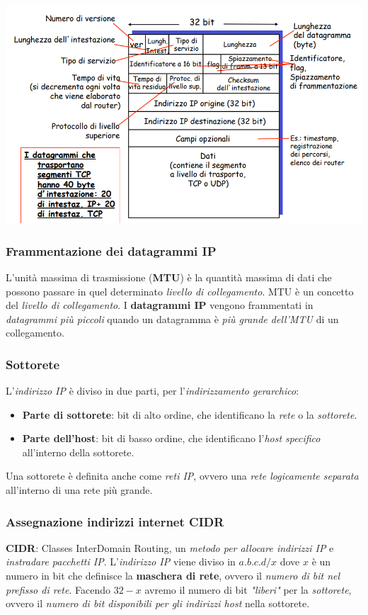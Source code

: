 \begin{center}
  \includegraphics[width=\textwidth]{img/ipdatagramma.png}
\end{center}

\subsubsection{Frammentazione dei datagrammi IP}
L'unità massima di trasmissione (\textbf{MTU}) è la quantità massima di dati che possono passare in quel determinato \textit{livello di collegamento}. MTU è un concetto del \textit{livello di collegamento}.
I \textbf{datagrammi IP} vengono frammentati in \textit{datagrammi} \textit{più piccoli} quando un datagramma è \textit{più grande dell'MTU} di un collegamento.

\subsubsection{Sottorete}
L'\textit{indirizzo IP} è diviso in due parti, per l'\textit{indirizzamento gerarchico}:
\begin{itemize}
  \item \textbf{Parte di sottorete}: bit di alto ordine, che identificano la \textit{rete} o la \textit{sottorete}.
  \item \textbf{Parte dell'host}: bit di basso ordine, che identificano l'\textit{host specifico} all'interno della sottorete.
\end{itemize}
Una sottorete è definita anche come \textit{reti IP}, ovvero una \textit{rete logicamente separata} all'interno di una rete più grande.

\subsubsection{Assegnazione indirizzi internet CIDR}
\textbf{CIDR}: Classes InterDomain Routing, un \textit{metodo per allocare indirizzi IP} e \textit{instradare pacchetti IP}.
L'\textit{indirizzo IP} viene diviso in $a.b.c.d/x$ dove $x$ è un numero in bit che definisce la \textbf{maschera di rete}, ovvero il \textit{numero di bit nel prefisso di rete}.
Facendo $32 - x$ avremo il numero di bit \textit{"liberi"} per la \textit{sottorete}, ovvero il \textit{numero di bit disponibili per gli indirizzi host} nella sottorete.
